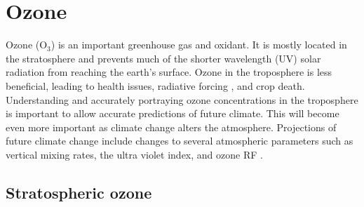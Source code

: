 \section{Ozone}
\label{LR:O3}
  
  Ozone (O$_3$) is an important greenhouse gas and oxidant.
  It is mostly located in the stratosphere and prevents much of the shorter wavelength (UV) solar radiation from reaching the earth's surface.
  Ozone in the troposphere is less beneficial, leading to health issues, radiative forcing \parencite{Stevenson2013}, and crop death.
  Understanding and accurately portraying ozone concentrations in the troposphere is important to allow accurate predictions of future climate.
  This will become even more important as climate change alters the atmosphere.
  Projections of future climate change include changes to several atmospheric parameters such as vertical mixing rates, the ultra violet index, and ozone RF \parencite{Hegglin2009}.
  
  \subsection{Stratospheric ozone}
  
